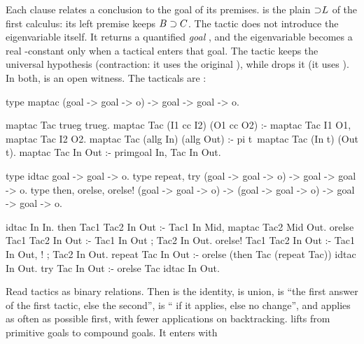 {\noindent Each clause relates a conclusion to the goal of its premises.  is the plain ${\supset}L$ of
the first calculus: its left premise  keeps $B\supset C$. The tactic  does not
introduce the eigenvariable itself. It returns a quantified \emph{goal} , and the
eigenvariable becomes a real -constant only when a tactical enters that goal. The tactic 
keeps the universal hypothesis (contraction: it uses the original ), while  drops it
(it uses ). In both,  is an open witness. The tacticals are :

\begin{lprolog}
type maptac   (goal -> goal -> o) -> goal -> goal -> o.

maptac Tac trueg trueg.
maptac Tac (I1 cc I2) (O1 cc O2) :- maptac Tac I1 O1,
                                    maptac Tac I2 O2.
maptac Tac (allg In) (allg Out) :- pi t\ maptac Tac (In t) (Out t).
maptac Tac In Out :- primgoal In, Tac In Out.

type idtac          goal -> goal -> o.
type repeat, try    (goal -> goal -> o) -> goal -> goal -> o.
type then,
     orelse, orelse! (goal -> goal -> o) ->
                     (goal -> goal -> o) -> goal -> goal -> o.

idtac             In In.
then    Tac1 Tac2 In Out :- Tac1 In Mid, maptac Tac2 Mid Out.
orelse  Tac1 Tac2 In Out :- Tac1 In Out  ; Tac2 In Out.
orelse! Tac1 Tac2 In Out :- Tac1 In Out, ! ; Tac2 In Out.
repeat  Tac       In Out :- orelse (then Tac (repeat Tac))
                                   idtac In Out.
try     Tac       In Out :- orelse Tac idtac In Out.
\end{lprolog}

\noindent Read tactics as binary relations. Then  is the identity,  is union,
 is ``the first answer of the first tactic, else the second'',  is `` if it
applies, else no change'', and  applies  as often as possible first, with fewer
applications on backtracking.  lifts  from primitive goals to compound goals. It enters
 with }
